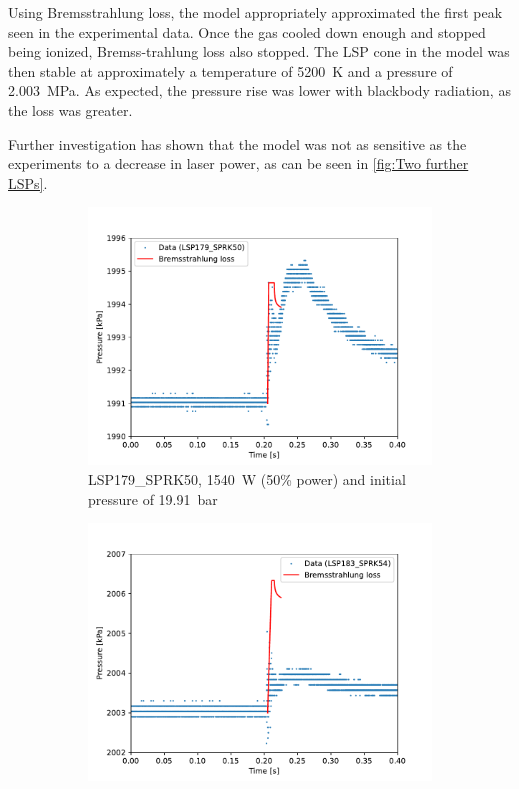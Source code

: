         Using Bremsstrahlung loss, the model appropriately approximated the first peak seen in the experimental data. Once the gas cooled down enough and stopped being ionized, Bremss-trahlung loss also stopped. The LSP cone in the model was then stable at approximately a temperature of \qty{5200}{K} and a pressure of \qty{2.003}{MPa}. As expected, the pressure rise was lower with blackbody radiation, as the loss was greater.

        Further investigation has shown that the model was not as sensitive as the experiments to a decrease in laser power, as can be seen in \autoref{fig:Two further LSPs}.

        \begin{figure}[!ht]
            \centering
            \begin{subfigure}[t]{0.45\textwidth}
                \centering
                \includegraphics[width=\textwidth]{assets/2 models/LSP179_SPRK50.pdf}
                \caption{LSP179\_SPRK50, \qty{1540}{W} (50\% power) and initial pressure of \qty{19.91}{bar}}
            \end{subfigure}
            \hfill
            \begin{subfigure}[t]{0.45\textwidth}
                \centering
                \includegraphics[width=\textwidth]{assets/2 models/LSP183_SPRK54.pdf}

\end{subfigure}
\end{figure}
